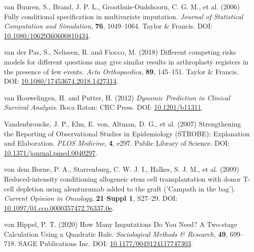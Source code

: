 \documentclass[
  letterpaper,
  DIV=11,
  numbers=noendperiod]{scrreprt}
\newlength{\cslhangindent}
\newlength{\cslentryspacingunit} %
\newenvironment{CSLReferences}[2] %
 {%
  \setlength{\parindent}{0pt}
  \ifodd #1
  \let\oldpar\par
  \def\par{\hangindent=\cslhangindent\oldpar}
  \fi
  \setlength{\parskip}{#2\cslentryspacingunit}
 }%
 {}
\begin{document}
\begin{CSLReferences}{1}{0}
\leavevmode{}%
van Buuren, S., Brand, J. P. L., Groothuis-Oudshoorn, C. G. M., et al.
(2006) Fully conditional specification in multivariate imputation.
\emph{Journal of Statistical Computation and Simulation}, \textbf{76},
1049--1064. Taylor \& Francis. DOI:
\href{https://doi.org/10.1080/10629360600810434}{10.1080/10629360600810434}.

\leavevmode{}%
van der Pas, S., Nelissen, R. and Fiocco, M. (2018) Different competing
risks models for different questions may give similar results in
arthroplasty registers in the presence of few events. \emph{Acta
Orthopaedica}, \textbf{89}, 145--151. Taylor \& Francis. DOI:
\href{https://doi.org/10.1080/17453674.2018.1427314}{10.1080/17453674.2018.1427314}.

\leavevmode{}%
van Houwelingen, H. and Putter, H. (2012) \emph{Dynamic {Prediction} in
{Clinical Survival Analysis}}. Boca Raton: CRC Press. DOI:
\href{https://doi.org/10.1201/b11311}{10.1201/b11311}.

\leavevmode{}%
Vandenbroucke, J. P., Elm, E. von, Altman, D. G., et al. (2007)
Strengthening the {Reporting} of {Observational Studies} in
{Epidemiology} ({STROBE}): {Explanation} and {Elaboration}. \emph{PLOS
Medicine}, \textbf{4}, e297. Public Library of Science. DOI:
\href{https://doi.org/10.1371/journal.pmed.0040297}{10.1371/journal.pmed.0040297}.

\leavevmode{}%
von dem Borne, P. A., Starrenburg, C. W. J. I., Halkes, S. J. M., et al.
(2009) Reduced-intensity conditioning allogeneic stem cell
transplantation with donor {T-cell} depletion using alemtuzumab added to
the graft ('{Campath} in the bag'). \emph{Current Opinion in Oncology},
\textbf{21 Suppl 1}, S27--29. DOI:
\href{https://doi.org/10.1097/01.cco.0000357472.76337.0e}{10.1097/01.cco.0000357472.76337.0e}.

\leavevmode{}%
von Hippel, P. T. (2020) How {Many Imputations Do You Need}? {A
Two-stage Calculation Using} a {Quadratic Rule}. \emph{Sociological
Methods \& Research}, \textbf{49}, 699--718. SAGE Publications Inc. DOI:
\href{https://doi.org/10.1177/0049124117747303}{10.1177/0049124117747303}.


\end{CSLReferences}
\end{document}
